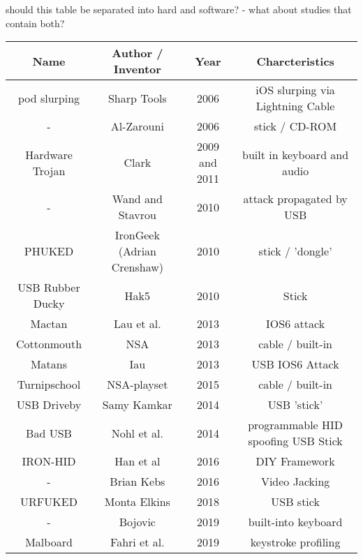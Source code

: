 should this table be separated into hard and software? - what about studies that contain both?
\begin{center}
\begin{tabular}{|c c c c|} 
 \hline
 Name & Author / Inventor & Year & Charcteristics \\ [0.5ex] 
 \hline \hline
 pod slurping & Sharp Tools \cite{SharpIdeasDownloads2006} & 2006 & iOS slurping via Lightning Cable \\
 \hline
 -  &  Al-Zarouni \cite{al-zarouniRealityRisksConsented2006} & 2006 & stick / CD-ROM \\
 \hline
 Hardware Trojan & Clark \cite{clarkHardwareTrojanHorse2009} & 2009 and 2011 & built in keyboard and audio \\
 \hline
 - & Wand and Stavrou \cite{wangExploitingSmartphoneUSB2010} & 2010 & attack propagated by USB \\
 \hline
 PHUKED & IronGeek  (Adrian Crenshaw) \cite{ProgrammableHIDUSB} & 2010 & stick / 'dongle'  \\
 \hline
 USB Rubber Ducky & Hak5 \cite{USBRubberDucky} & 2010 & Stick \\
 \hline
 Mactan & Lau et al. \cite{lauMactansInjectingMalware2013} & 2013 & IOS6 attack \\
 \hline
 Cottonmouth & NSA \cite{appelbaumCatalogRevealsNSA2013} & 2013 & cable / built-in  \\ 
 \hline
 Matans & Iau \cite{lauMactansInjectingMalware2013} & 2013 & USB IOS6 Attack \\
 \hline
 Turnipschool & NSA-playset \cite{NSAPlaysetTurnipschoolHtml} & 2015 & cable / built-in  \\
 \hline
 USB Driveby & Samy Kamkar \cite{SamyKamkarUSBdriveby} & 2014 & USB 'stick'\\
 \hline
 Bad USB & Nohl et al.\cite{Srlabsbadusbblackhatv1Pdf2014} & 2014 & programmable HID spoofing USB Stick\\
 \hline
 IRON-HID & Han et al \cite{hanIRONHIDCreateYour2016} & 2016 & DIY Framework \\
 \hline
 - & Brian Kebs\cite{RoadWarriorsBeware2016} & 2016 & Video Jacking \\
 \hline
 URFUKED & Monta Elkins \cite{elkinsHackingHardwareIntroducing} & 2018 & USB stick \\
 \hline
 -  & Bojovic \cite{bojovicRisingThreatHardware2019} & 2019 & built-into keyboard \\
 \hline
 Malboard & Fahri et al. \cite{farhiMalboardNovelUser2019} & 2019 & keystroke profiling \\

\end{tabular}
\end{center}
